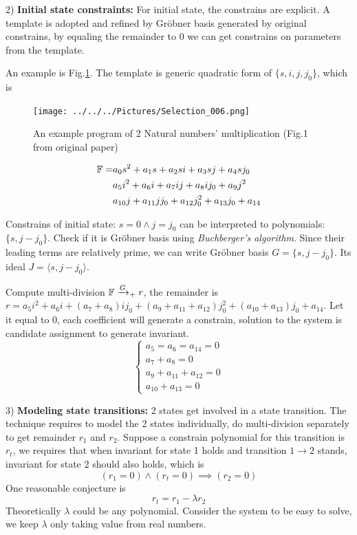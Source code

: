 2) {\bf Initial state constraints:} For initial state, the constrains are explicit. A template is adopted and refined by Gr\"obner basis 
generated by original constrains, by equaling the remainder to 0 we can get constrains on
parameters from the template.

An example is Fig.\ref{fig:loopinv}. The template is generic quadratic form of $\{s,i,j,j_0\}$, which is
\begin{figure}[hbt]
	\begin{center}
	\texttt{[image: ../../../Pictures/Selection\_006.png]}
	\end{center}
	\caption{An example program of 2 Natural numbers' multiplication (Fig.1 from original paper)}
	\label{fig:loopinv}
\end{figure}
\begin{align}
{\mathbb{F}} =& a_0s^2+a_1s+a_2si+a_3sj+a_4sj_0\nonumber\\
&a_5i^2+a_6i+a_7ij+a_8ij_0+a_9j^2\nonumber\\
&a_{10}j+a_{11}jj_0+a_{12}j_0^2+a_{13}j_0+a_{14}\nonumber
\end{align}

Constrains of initial state: $s=0\land j=j_0$ can be interpreted to polynomials:
$\{s, j-j_0\}$. Check if it is Gr\"obner basis using \emph{Buchberger's algorithm}. Since
their leading terms are relatively prime, we can write Gr\"obner basis $G=\{s, j-j_0\}$. Its ideal
$J=\langle s,j-j_0\rangle$.

Compute multi-division ${\mathbb{F}} \xrightarrow{G}_+ r$, the remainder is
$r = a_5i^2+a_6i+(a_7+a_8)ij_0+(a_9+a_{11}+a_{12})j_0^2+(a_{10}+a_{13})j_0+a_{14}$.
Let it equal to 0, each coefficient will generate a constrain, solution to the system is candidate
assignment to generate invariant.
\begin{equation}
\left\{
\begin{array}{l}
a_5=a_6=a_{14}=0\\
a_7+a_8=0\\
a_9+a_{11}+a_{12}=0\\
a_{10}+a_{13}=0
\end{array}\right.
\nonumber
\end{equation}

3) {\bf Modeling state transitions:}
2 states get involved in a state transition. The technique requires to model the 2 states individually,
do multi-division separately to get remainder $r_1$ and $r_2$. Suppose a constrain polynomial for
this transition is $r_t$, we requires that when invariant for state 1 holds and transition $1\to 2$ stands,
invariant for state 2 should also holds, which is
$$(r_1 = 0)\land (r_t = 0) \implies (r_2 = 0)$$
One reasonable conjecture is
$$r_t = r_1 - \lambda r_2$$
Theoretically $\lambda$ could be any polynomial. Consider the system to be easy to solve, we keep $\lambda$
only taking value from real numbers.

